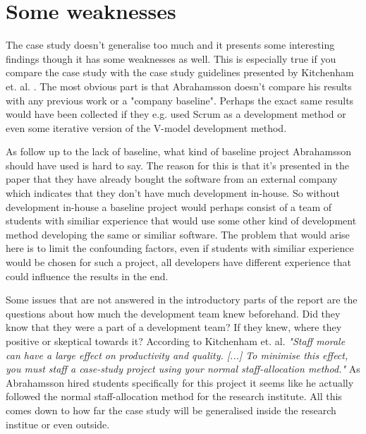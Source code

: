 \section{Some weaknesses}
The case study doesn't generalise too much and it presents some interesting
findings though it has some weaknesses as well. This is especially true if you
compare the case study with the case study guidelines presented by Kitchenham
et. al. \cite{kitchenham1995}. The most obvious part is that Abrahamsson
doesn't compare his results with any previous work or a "company baseline".
Perhaps the exact same results would have been collected if they e.g. used
Scrum as a development method or even some iterative version of the V-model
development method.

As follow up to the lack of baseline, what kind of baseline project Abrahamsson should
have used is hard to say. The reason for this is that it's presented in the
paper that they have already bought the software from an external company which
indicates that they don't have much development in-house. So without
development in-house a baseline project would perhaps consist of a team of
students with similiar experience that would use some other kind of development method
developing the same or similiar software. The problem that would arise here is
to limit the confounding factors, even if students with similiar experience
would be chosen for such a project, all developers have different experience
that could influence the results in the end.

Some issues that are not answered in the introductory parts of the report are
the questions about how much the development team knew beforehand. Did they
know that they were a part of a development team? If they knew, where they
positive or skeptical towards it? According to Kitchenham et. al. {\em "Staff
    morale can have a large effect on productivity and quality. [...] To
    minimise this effect, you must staff a case-study project using your normal
staff-allocation method."} As Abrahamsson hired students specifically for this
project it seems like he actually followed the normal staff-allocation method
for the research institute. All this comes down to how far the case study will
be generalised inside the research institue or even outside.
